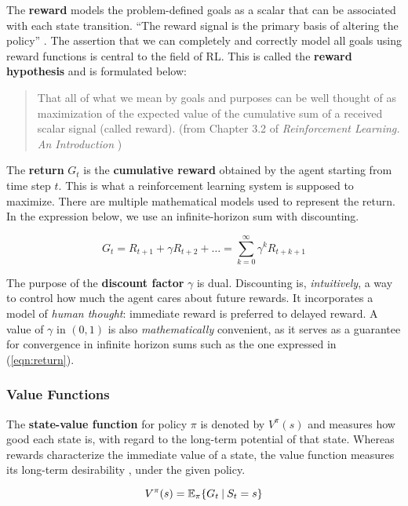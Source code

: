 The \textbf{reward} models the problem-defined goals as a scalar that can be associated with each state transition.
``The reward signal is the primary basis of altering the policy'' \cite{rlai}.
The assertion that we can completely and correctly model all goals using reward functions is central to the field of RL.
This is called the \textbf{reward hypothesis} and is formulated below:
\begin{quotation}
    That all of what we mean by goals and purposes can be well thought of as maximization of the expected value of the cumulative sum of a received scalar signal (called reward). (from Chapter 3.2 of \emph{Reinforcement Learning. An Introduction} \cite{rlai})
\end{quotation}

The \textbf{return} \(G_t\) is the \textbf{cumulative reward} obtained by the agent starting from time step \(t\).
This is what a reinforcement learning system is supposed to maximize.
There are multiple mathematical models used to represent the return.
In the expression below, we use an infinite-horizon sum with discounting.

\begin{equation} \label{eqn:return}
    G_t = R_{t+1} + \gamma R_{t+2} + \dots = \sum_{k = 0}^{\infty}{\gamma^{k} R_{t + k + 1}}    
\end{equation}

The purpose of the \textbf{discount factor} $\gamma$ is dual.
Discounting is, \emph{intuitively}, a way to control how much the agent cares about future rewards.
It incorporates a model of \emph{human thought}: immediate reward is preferred to delayed reward.
A value of $\gamma$ in $(0, 1)$ is also \emph{mathematically} convenient, as it serves as a guarantee for convergence in infinite horizon sums such as the one expressed in (\ref{eqn:return}).

\subsubsection{Value Functions} \label{rl:value-func}
The \textbf{state-value function} for policy \(\pi\) is denoted by \(V^{\pi}(s)\) and measures how good each state is, with regard to the long-term potential of that state.
Whereas rewards characterize the immediate value of a state, the value function measures its long-term desirability \cite{rlai}, under the given policy.

\begin{equation} \label{eqn:value}
    V^{\pi}(s) = \mathbb{E}_{\pi}\{ G_t \:\vert\: S_t = s \}
\end{equation}

